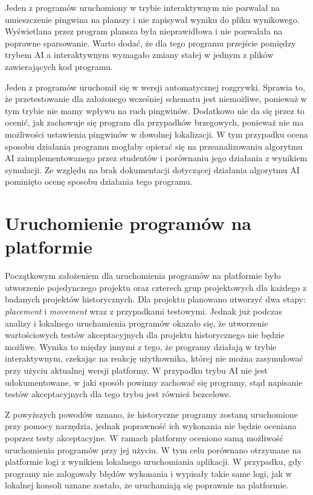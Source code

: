 Jeden z programów uruchomiony w trybie interaktywnym nie pozwalał na umieszczenie pingwina na planszy i nie zapisywał wyniku do pliku wynikowego.
Wyświetlana przez program plansza była nieprawidłowa i nie pozwalała na poprawne sparsowanie.
Warto dodać, że dla tego programu przejście pomiędzy trybem AI a interaktywnym wymagało zmiany stałej w jednym z plików zawierających kod programu.

Jeden z programów uruchomił się w wersji automatycznej rozgrywki.
Sprawia to, że przetestowanie dla założonego wcześniej schematu jest niemożliwe, ponieważ w tym trybie nie mamy wpływu na ruch pingwinów.
Dodatkowo nie da się przez to ocenić, jak zachowuje się program dla przypadków brzegowych, ponieważ nie ma możliwości ustawienia pingwinów w dowolnej lokalizacji.
W tym przypadku ocena sposobu działania programu mogłaby opierać się na przeanalizowaniu algorytmu AI zaimplementowanego przez studentów i porównaniu jego działania z wynikiem symulacji.
Ze względu na brak dokumentacji dotyczącej działania algorytmu AI pominięto ocenę sposobu działania tego programu.

\section{Uruchomienie programów na platformie}
\label{veryfication_platform}

Początkowym założeniem dla uruchomienia programów na platformie było utworzenie pojedynczego projektu oraz czterech grup projektowych dla każdego z badanych projektów historycznych.
Dla projektu planowano utworzyć dwa etapy: \textit{placement} i \textit{movement} wraz z przypadkami testowymi.
Jednak już podczas analizy i lokalnego uruchamienia programów okazało się, że utworzenie wartościowych testów akceptacyjnych dla projektu historycznego nie będzie możliwe.
Wynika to między innymi z tego, że programy działają w trybie interaktywnym, czekając na reakcję użytkownika, której nie można zasymulować przy użyciu aktualnej wersji platformy.
W przypadku trybu AI nie jest udokumentowane, w jaki sposób powinny zachować się programy, stąd napisanie testów akceptacyjnych dla tego trybu jest również bezcelowe.

Z powyższych powodów uznano, że historyczne programy zostaną uruchomione przy pomocy narzędzia, jednak poprawność ich wykonania nie będzie oceniana poprzez testy akceptacyjne.
W ramach platformy oceniono samą możliwość uruchomienia programów przy jej użyciu.
W tym celu porównano otrzymane na platformie logi z wynikiem lokalnego uruchomiania aplikacji.
W przypadku, gdy programy nie zalogowały błędów wykonania i wypisały takie same logi, jak w lokalnej konsoli uznane zostało, że uruchamiają się poprawnie na platformie.

